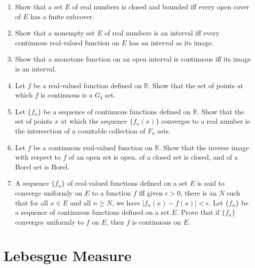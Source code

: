 \documentclass[a4paper,10pt]{book}
\theoremstyle{plain} %
\begin{document}
\begin{enumerate}
	\item Show that a set $E$ of real numbers is closed and bounded iff every open cover of $E$ has a finite subcover.
	\item Show that a nonempty set $E$ of real numbers is an interval iff every continuous real-valued function on $E$ has an interval as its image.
	\item Show that a monotone function on an open interval is continuous iff its image is an interval. 
	\item Let $f$ be a real-valued function defined on $\mathbb{R}$. Show that the set of points at which $f$ is continuous is a $G_\delta$ set.
	\item Let $\{ f_n\}$ be a sequence of continuous functions defined on $\mathbb{R}$. Show that the set of points $x$ at which the sequence $\{f_n(x)\}$ converges to a real number is the intersection of a countable collection of $F_\sigma$ sets.
	\item Let $f$ be a continuous real-valued function on $\mathbb{R}$. Show that the inverse image with respect to $f$ of an open set is open, of a closed set is closed, and of a Borel set is Borel.
	\item A sequence $\{f_n\}$ of real-valued functions defined on a set $E$ is said to converge uniformly on $E$ to a function $f$ iff given $\epsilon >0$, there is an $N$ such that for all $x \in E$ and all $n \ge N$, we have $|f_n(x) - f(x)| < \epsilon$. Let $\{f_n\}$ be a sequence of continuous functions defined on a set $E$. Prove that if $\{f_n\}$ converges uniformly to $f$ on $E$, then $f$ is continuous on $E$. 
\end{enumerate}

\chapter{Lebesgue Measure}
\end{document}
